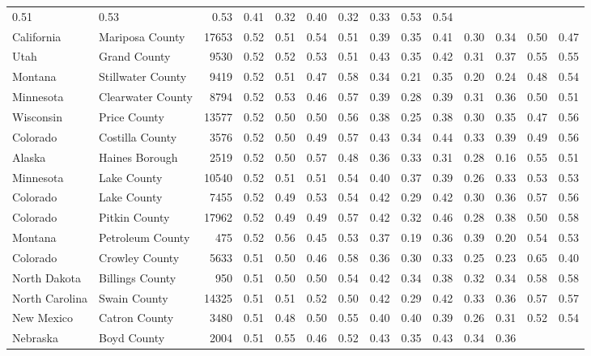 \documentclass[10pt, letterpaper]{article}
\begin{document}
\begin{spacing}{1.4}
\begin{table}
{\begin{tabular}{llrrrrrrrrrrrr}
    0.51 & 0.53 & 0.53 & 0.41 & 0.32 & 0.40 & 0.32 &
    0.33 & 0.53 & 0.54 \\ California & Mariposa County & 17653 &
    0.52 & 0.51 & 0.54 & 0.51 & 0.39 & 0.35 & 0.41 &
    0.30 & 0.34 & 0.50 & 0.47 \\ Utah & Grand County & 9530 &
    0.52 & 0.52 & 0.53 & 0.51 & 0.43 & 0.35 & 0.42 &
    0.31 & 0.37 & 0.55 & 0.55 \\ Montana & Stillwater County &
    9419 & 0.52 & 0.51 & 0.47 & 0.58 & 0.34 & 0.21 &
    0.35 & 0.20 & 0.24 & 0.48 & 0.54 \\ Minnesota &
    Clearwater County & 8794 & 0.52 & 0.53 & 0.46 & 0.57 &
    0.39 & 0.28 & 0.39 & 0.31 & 0.36 & 0.50 & 0.51
    \\ Wisconsin & Price County & 13577 & 0.52 & 0.50 & 0.50 &
    0.56 & 0.38 & 0.25 & 0.38 & 0.30 & 0.35 & 0.47 &
    0.56 \\ Colorado & Costilla County & 3576 & 0.52 & 0.50 &
    0.49 & 0.57 & 0.43 & 0.34 & 0.44 & 0.33 & 0.39 &
    0.49 & 0.56 \\ Alaska & Haines Borough & 2519 & 0.52 & 0.50
    & 0.57 & 0.48 & 0.36 & 0.33 & 0.31 & 0.28 & 0.16
    & 0.55 & 0.51 \\ Minnesota & Lake County & 10540 & 0.52 &
    0.51 & 0.51 & 0.54 & 0.40 & 0.37 & 0.39 & 0.26 &
    0.33 & 0.53 & 0.53 \\ Colorado & Lake County & 7455 & 0.52 &
    0.49 & 0.53 & 0.54 & 0.42 & 0.29 & 0.42 & 0.30 &
    0.36 & 0.57 & 0.56 \\ Colorado & Pitkin County & 17962 &
    0.52 & 0.49 & 0.49 & 0.57 & 0.42 & 0.32 & 0.46 &
    0.28 & 0.38 & 0.50 & 0.58 \\ Montana & Petroleum County &
    475 & 0.52 & 0.56 & 0.45 & 0.53 & 0.37 & 0.19 &
    0.36 & 0.39 & 0.20 & 0.54 & 0.53 \\ Colorado & Crowley
    County & 5633 & 0.51 & 0.50 & 0.46 & 0.58 & 0.36 &
    0.30 & 0.33 & 0.25 & 0.23 & 0.65 & 0.40 \\ North
    Dakota & Billings County & 950 & 0.51 & 0.50 & 0.50 & 0.54 &
    0.42 & 0.34 & 0.38 & 0.32 & 0.34 & 0.58 & 0.58
    \\ North Carolina & Swain County & 14325 & 0.51 & 0.51 & 0.52 &
    0.50 & 0.42 & 0.29 & 0.42 & 0.33 & 0.36 & 0.57 &
    0.57 \\ New Mexico & Catron County & 3480 & 0.51 & 0.48 &
    0.50 & 0.55 & 0.40 & 0.40 & 0.39 & 0.26 & 0.31 &
    0.52 & 0.54 \\ Nebraska & Boyd County & 2004 & 0.51 & 0.55 &
    0.46 & 0.52 & 0.43 & 0.35 & 0.43 & 0.34 & 0.36 &

\end{tabular}}
\end{table}
\end{spacing}
\end{document}
